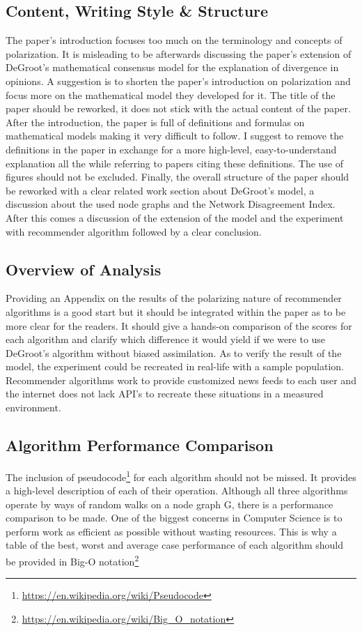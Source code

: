 \documentclass[14]{article}
\begin{document}
\subsection{Content, Writing Style \& Structure}
The paper's introduction focuses too much on the terminology and concepts of polarization. It is misleading to be afterwards discussing the paper's extension of DeGroot's mathematical consensus model for the explanation of divergence in opinions. A suggestion is to shorten the paper's introduction on polarization and focus more on the mathematical model they developed for it. The title of the paper should be reworked, it does not stick with the actual content of the paper. 
After the introduction, the paper is full of definitions and formulas on mathematical models making it very difficult to follow. I suggest to remove the definitions in the paper in exchange for a more high-level, easy-to-understand explanation all the while referring to papers citing these definitions. The use of figures should not be excluded.
\newline
Finally, the overall structure of the paper should be reworked with a clear related work section about DeGroot's model, a discussion about the used node graphs and the Network Disagreement Index. After this comes a discussion of the extension of the model and the experiment with recommender algorithm followed by a clear conclusion.

\subsection{Overview of Analysis}
Providing an Appendix on the results of the polarizing nature of recommender algorithms is a good start but it should be integrated within the paper as to be more clear for the readers. It should give a hands-on comparison of the scores for each algorithm and clarify which difference it would yield if we were to use DeGroot's algorithm without biased assimilation.
\newline
As to verify the result of the model, the experiment could be recreated in real-life with a sample population. Recommender algorithms work to provide customized news feeds to each user and the internet does not lack API's to recreate these situations in a measured environment.

\subsection{Algorithm Performance Comparison}
The inclusion of pseudocode\footnote{\protect\url{https://en.wikipedia.org/wiki/Pseudocode}} for each algorithm should not be missed. It provides a high-level description of each of their operation. Although all three algorithms operate by ways of random walks on a node graph G, there is a performance comparison to be made. One of the biggest concerns in Computer Science is to perform work as efficient as possible without wasting resources. This is why a table of the best, worst and average case performance of each algorithm should be provided in Big-O notation\footnote{\protect\url{https://en.wikipedia.org/wiki/Big\_O\_notation}}
\end{document}
